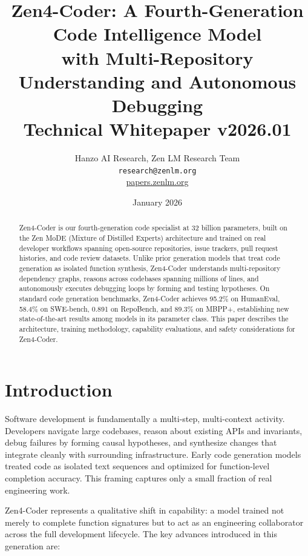 \documentclass[11pt,a4paper]{article}
\title{\textbf{Zen4-Coder: A Fourth-Generation Code Intelligence Model\\
with Multi-Repository Understanding and Autonomous Debugging}\\[0.5em]
\large Technical Whitepaper v2026.01}
\author{Hanzo AI Research, Zen LM Research Team\\
\texttt{research@zenlm.org}\\
\href{https://papers.zenlm.org}{papers.zenlm.org}}
\date{January 2026}
\begin{document}
\maketitle

\begin{abstract}
Zen4-Coder is our fourth-generation code specialist at 32 billion parameters, built on the Zen MoDE (Mixture of Distilled Experts) architecture and trained on real developer workflows spanning open-source repositories, issue trackers, pull request histories, and code review datasets. Unlike prior generation models that treat code generation as isolated function synthesis, Zen4-Coder understands multi-repository dependency graphs, reasons across codebases spanning millions of lines, and autonomously executes debugging loops by forming and testing hypotheses. On standard code generation benchmarks, Zen4-Coder achieves 95.2\% on HumanEval, 58.4\% on SWE-bench, 0.891 on RepoBench, and 89.3\% on MBPP+, establishing new state-of-the-art results among models in its parameter class. This paper describes the architecture, training methodology, capability evaluations, and safety considerations for Zen4-Coder.
\end{abstract}

\tableofcontents
\newpage

\section{Introduction}

Software development is fundamentally a multi-step, multi-context activity. Developers navigate large codebases, reason about existing APIs and invariants, debug failures by forming causal hypotheses, and synthesize changes that integrate cleanly with surrounding infrastructure. Early code generation models treated code as isolated text sequences and optimized for function-level completion accuracy. This framing captures only a small fraction of real engineering work.

Zen4-Coder represents a qualitative shift in capability: a model trained not merely to complete function signatures but to act as an engineering collaborator across the full development lifecycle. The key advances introduced in this generation are:
\end{document}
